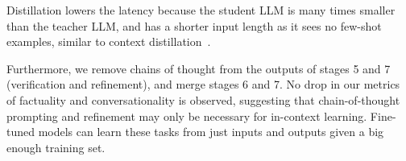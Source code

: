 Distillation lowers the latency because the student LLM is many times smaller than the teacher LLM, and has a shorter input length as it sees no few-shot examples, similar to context distillation~\cite{snell2022learning}. 

Furthermore, 
we remove chains of thought from the outputs of stages 5 and 7 (verification and refinement), and merge stages 6 and 7. No drop in our metrics of factuality and conversationality is observed, suggesting that chain-of-thought prompting and refinement may only be necessary for in-context learning. Fine-tuned models can learn these tasks from just inputs and outputs given a big enough training set.